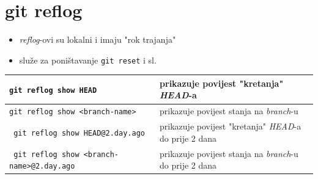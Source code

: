 \documentclass[10pt]{article}
\begin{document}
    \section*{\color{BrickRed} git reflog}
    \begin{itemize}
        \item \textit{reflog}-ovi su lokalni i imaju "rok trajanja"
        \item služe za poništavanje \texttt{git reset} i sl.
    \end{itemize}
    \begin{tabular}{|>{\tt}p{9.00cm}|>{}p{15.50cm}|}
        \hline
        git reflog show HEAD                        & prikazuje povijest "kretanja" \textit{HEAD}-a \\ \hline
        git reflog show <branch-name>               & prikazuje povijest stanja na \textit{branch}-u \\ \hline
        git reflog show HEAD@{2.day.ago}            & prikazuje povijest "kretanja" \textit{HEAD}-a do prije 2 dana \\ \hline
        git reflog show <branch-name>@{2.day.ago}   & prikazuje povijest stanja na \textit{branch}-u do prije 2 dana \\ \hline
    \end{tabular}
\end{document}
